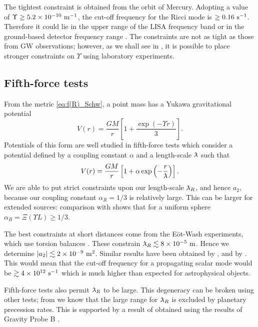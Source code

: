 The tightest constraint is obtained from the orbit of Mercury. Adopting a value of $\Upsilon \geq 5.2 \times 10^{-10}~\mathrm{m^{-1}}$, the cut-off frequency for the Ricci mode is $\geq 0.16~\mathrm{s^{-1}}$. Therefore it could lie in the upper range of the LISA frequency band \citep{Bender1998,Danzmann2003} or in the ground-based detector frequency range \citep{Abramovici1992, Abbott2009, Accadia2010}. The constraints are not as tight as those from GW observations; however, as we shall see in , it is possible to place stronger constraints on $\Upsilon$ using laboratory experiments.

\subsection{Fifth-force tests}\label{sec:Fifth}

From the metric \eqref{eq:f(R)_Schw}, a point mass has a Yukawa gravitational potential \citep{Stelle1978, Capozziello2009a, Naf2010}
\begin{equation}
V(r) = \dfrac{GM}{r}\left[1 + \dfrac{\exp(- \Upsilon r)}{3}\right].
\end{equation}
Potentials of this form are well studied in fifth-force tests \citep{Adelberger2003, Adelberger2009, Will2006} which consider a potential defined by a coupling constant $\alpha$ and a length-scale $\lambdabar$ such that
\begin{equation}
V(r) = \dfrac{GM}{r}\left[1 + \alpha\exp\left(-\dfrac{r}{\lambdabar}\right)\right].
\end{equation}
We are able to put strict constraints upon our length-scale $\lambdabar_R$, and hence $a_2$, because our coupling constant $\alpha_R = 1/3$ is relatively large. This can be larger for extended sources: comparison with  shows that for a uniform sphere $\alpha_R = \Xi(\Upsilon L) \geq 1/3$.

The best constraints at short distances come from the E\"{o}t-Wash experiments, which use torsion balances \citep{Kapner2007a, Hoyle2004}. These constrain $\lambdabar_R \lesssim 8\times 10^{-5}\units{m}$. Hence we determine $|a_2| \lesssim 2 \times 10^{-9}~\mathrm{m^2}$. Similar results have been obtained by \citet{Cembranos2009}, and by \citet{Naf2010}. This would mean that the cut-off frequency for a propagating scalar mode would be $\gtrsim 4 \times 10^{12}~\mathrm{s^{-1}}$ which is much higher than expected for astrophysical objects.

Fifth-force tests also permit $\lambdabar_R$ to be large. This degeneracy can be broken using other tests; from  we know that the large range for $\lambdabar_R$ is excluded by planetary precession rates. This is supported by a result of \citet{Naf2010} obtained using the results of Gravity Probe B \citep{Everitt2009,Everitt2011}.

